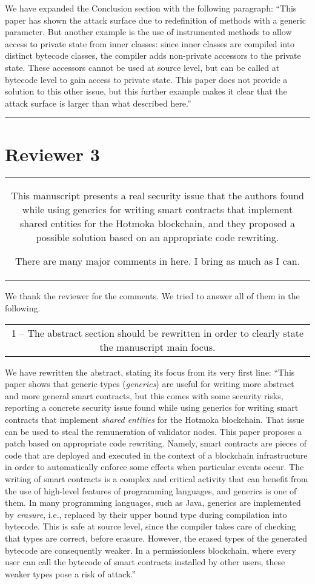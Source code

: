 \documentclass[journal,onecolumn, 11pt]{IEEEtran}
\newcommand{\BOX}[1]
{
  {\it
    \begin{center}
      \begin{tabular}{|c|}
        \hline
        \parbox{0.97\columnwidth}{
          \medskip
          #1
          \medskip} \\
        \hline
      \end{tabular}
    \end{center}
  }
}
\begin{document}
We have expanded the Conclusion section with the following paragraph:
``This paper has shown the attack surface due to redefinition of methods with a generic parameter. But another example is the use of instrumented methods to allow access to private state from inner classes: since inner classes are compiled into distinct
bytecode classes, the compiler adds non-private accessors to the private state. These accessors cannot be used at source level, but can be called at bytecode level to gain access to private state.
This paper does not provide a solution to this other issue, but this further example
makes it clear that the attack surface is larger than what described here.''






\vspace{5mm}
\hrule
\section*{\textbf{Reviewer 3}}

\BOX{
This manuscript presents a real security issue that the authors found while using generics for writing smart contracts that implement shared entities for the Hotmoka blockchain, and they proposed a possible solution based on an appropriate code rewriting.

There are many major comments in here. I bring as much as I can.
}

We thank the reviewer for the comments. We tried to answer all of them in the following.

\BOX{
1 -- The abstract section should be rewritten in order to clearly state the manuscript main focus.
}

We have rewritten the abstract, stating its focus from its very first line:
``This paper shows that generic types (\emph{generics}) are useful for writing more abstract and more general smart contracts, but this comes with some security risks, reporting a concrete security issue found while using generics for writing smart contracts that implement \emph{shared entities} for the Hotmoka blockchain. That issue can be used to steal the remuneration of validator nodes. This paper proposes a patch based on appropriate code rewriting. Namely, smart contracts are pieces of code that are deployed and executed in the context of a blockchain infrastructure in order to automatically enforce some effects when particular events occur. The writing of smart contracts is a complex and critical activity that can benefit from the use of high-level features of programming languages, and generics is one of them. In many programming languages, such as Java, generics are implemented by \emph{erasure}, i.e., replaced by their upper bound type during compilation into bytecode. This is safe at source level, since the compiler takes care of checking that types are correct, before erasure. However, the erased types of the generated bytecode are consequently weaker. In a permissionless blockchain, where every user can call the bytecode of smart contracts installed by other users, these weaker types pose a risk of attack.''
\end{document}
